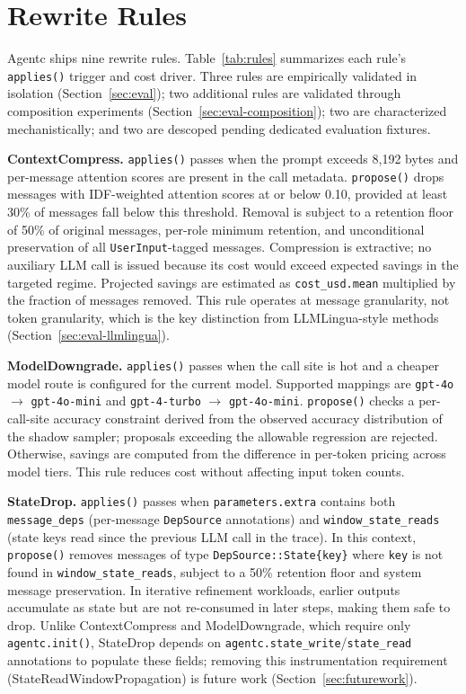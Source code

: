 \documentclass[sigconf,9pt]{acmart}
\begin{document}
\section{Rewrite Rules}
\label{sec:rules}

Agentc ships nine rewrite rules. Table~\ref{tab:rules} summarizes each rule's
\texttt{applies()} trigger and cost driver. Three rules are empirically validated in
isolation (Section~\ref{sec:eval}); two additional rules are validated through
composition experiments (Section~\ref{sec:eval-composition}); two are characterized
mechanistically; and two are descoped pending dedicated evaluation fixtures.

\textbf{ContextCompress.} \texttt{applies()} passes when the prompt exceeds 8,192
bytes and per-message attention scores are present in the call metadata.
\texttt{propose()} drops messages with IDF-weighted attention scores at or below 0.10,
provided at least 30\% of messages fall below this threshold. Removal is subject to a
retention floor of 50\% of original messages, per-role minimum retention, and
unconditional preservation of all \texttt{UserInput}-tagged messages. Compression is
extractive; no auxiliary LLM call is issued because its cost would exceed expected
savings in the targeted regime. Projected savings are estimated as
\texttt{cost\_usd.mean} multiplied by the fraction of messages removed. This rule
operates at message granularity, not token granularity, which is the key distinction
from LLMLingua-style methods (Section~\ref{sec:eval-llmlingua}).

\textbf{ModelDowngrade.} \texttt{applies()} passes when the call site is hot and a
cheaper model route is configured for the current model. Supported mappings are
\texttt{gpt-4o} $\rightarrow$ \texttt{gpt-4o-mini} and \texttt{gpt-4-turbo}
$\rightarrow$ \texttt{gpt-4o-mini}. \texttt{propose()} checks a per-call-site
accuracy constraint derived from the observed accuracy distribution of the shadow
sampler; proposals exceeding the allowable regression are rejected. Otherwise, savings
are computed from the difference in per-token pricing across model tiers. This rule
reduces cost without affecting input token counts.

\textbf{StateDrop.} \texttt{applies()} passes when \texttt{parameters.extra} contains
both \texttt{message\_deps} (per-message \texttt{DepSource} annotations) and
\texttt{window\_state\_reads} (state keys read since the previous LLM call in the
trace). In this context, \texttt{propose()} removes messages of type
\texttt{DepSource::State\{key\}} where \texttt{key} is not found in
\texttt{window\_state\_reads}, subject to a 50\% retention floor and system message
preservation. In iterative refinement workloads, earlier outputs accumulate as state
but are not re-consumed in later steps, making them safe to drop. Unlike ContextCompress
and ModelDowngrade, which require only \texttt{agentc.init()}, StateDrop depends on
\texttt{agentc.state\_write}/\texttt{state\_read} annotations to populate these fields;
removing this instrumentation requirement (StateReadWindowPropagation) is future work
(Section~\ref{sec:futurework}).
\end{document}
